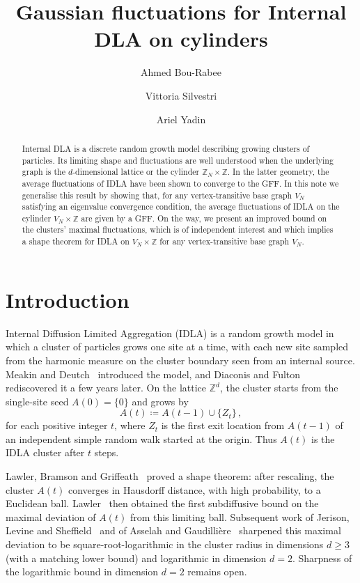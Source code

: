 \documentclass[11pt,a4paper,reqno]{amsart}
\author[A. Bou-Rabee]{Ahmed Bou-Rabee}
\author[V. Silvestri]{Vittoria Silvestri}
\author[A. Yadin]{Ariel Yadin}
\title{Gaussian fluctuations for Internal DLA on cylinders}
\theoremstyle{definition}
\newcommand{\bbZ}{{\ensuremath{\mathbb Z}} }
\begin{document}
\begin{abstract}
Internal DLA is a discrete random growth model describing growing clusters of particles. Its limiting shape and fluctuations are well understood when the underlying graph is the $d$-dimensional lattice or the cylinder $\bbZ_N \times \bbZ$. In the latter geometry, the average fluctuations of IDLA have been shown to converge to the GFF. In this note we generalise this result by showing that, for any vertex-transitive base graph $V_N$ satisfying an eigenvalue convergence condition, the average fluctuations of IDLA on the cylinder $V_N \times \bbZ$ are given by a GFF. On the way, we present an improved bound on the clusters' maximal fluctuations, which is of independent interest and which implies a shape theorem for IDLA on $V_N \times \bbZ$ for any vertex-transitive base graph $V_N$.
\end{abstract}

\maketitle




\section{Introduction} \label{sec:intro}
Internal Diffusion Limited Aggregation (IDLA) is a random growth model in which a cluster of particles grows one site at a time, with each new site sampled from the harmonic measure on the cluster boundary seen from an internal source. Meakin and Deutch~\cite{meakin1986formation} introduced the model, and Diaconis and Fulton~\cite{diaconis1991growth} rediscovered it a few years later. On the lattice $\bbZ^d$, the cluster starts from the single-site seed $A(0) = \{0\}$ and grows by
	\[ A(t) \coloneqq A(t-1) \cup \{ Z_t \}\,, \]
for each positive integer $t$, where $Z_t$ is the first exit location from $A(t-1)$ of an independent simple random walk started at the origin. Thus $A(t)$ is the IDLA cluster after $t$ steps.

Lawler, Bramson and Griffeath~\cite{lawler1992internal} proved a shape theorem: after rescaling, the cluster $A(t)$ converges in Hausdorff distance, with high probability, to a Euclidean ball. Lawler~\cite{lawler1995subdiffusive} then obtained the first subdiffusive bound on the maximal deviation of $A(t)$ from this limiting ball. Subsequent work of Jerison, Levine and Sheffield~\cite{jerison2012logarithmic, jerison2013internal} and of Asselah and Gaudilli\`ere~\cite{asselah2013logarithmic, asselah2013sublogarithmic, asselah2014lower} sharpened this maximal deviation to be square-root-logarithmic in the cluster radius in dimensions $d \geq 3$ (with a matching lower bound) and logarithmic in dimension $d = 2$. Sharpness of the logarithmic bound in dimension $d = 2$ remains open.
\end{document}
